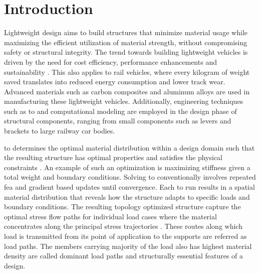 \documentclass[
  numbers=noenddot,
  english,  %
  a4paper,  %
  twoside,  %
  bibliography=totoc,
  headsepline,
  cleardoublepage=empty,
  parskip=half,
  draft=false
]{scrbook}
\theoremstyle{break}
\begin{document}
\printglossary[type=\acronymtype,title={Abbreviations},nonumberlist]


\renewcommand*{\chapterpagestyle}{scrplain}
\pagestyle{scrheadings}

\chapter{Introduction}\label{sec:introduction}

Lightweight design aims to build structures that minimize material usage while maximizing the efficient utilization of material strength, without compromising safety or structural integrity. The trend towards building lightweight vehicles is driven by the need for cost efficiency, performance enhancements and sustainability  \cite{c1}. This also applies to rail vehicles, where every kilogram of weight saved translates into reduced energy consumption and lower track wear. Advanced materials such as carbon composites and aluminum alloys are used in manufacturing these lightweight vehicles. Additionally, engineering techniques such as \gls{to} and computational modeling are employed in the design phase of structural components, ranging from small components such as levers and brackets to large railway car bodies.

\gls{to} determines the optimal material distribution within a design domain such that the resulting structure has optimal properties and satisfies the physical constraints \cite{c2}. An example of such an optimization is maximizing stiffness given a total weight and boundary conditions. Solving \gls{to} conventionally involves repeated \gls{fea} and gradient based updates until convergence.  Each \gls{to} run results in a spatial material distribution that reveals how the structure adapts to specific loads and boundary conditions. The resulting topology optimized structure capture the optimal stress flow paths for individual load cases where the material concentrates along the principal stress trajectories \cite{c3}. These routes along which load is
transmitted from its point of application to the supports are referred as load paths. The members carrying majority of the load also has highest material density are called dominant load paths and structurally essential features of a design.  
\end{document}
